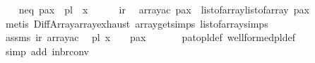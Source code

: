 \begin{isabellebody}
\ \ \isamarkupfalse%
\ neq{\isacharcolon}{\kern0pt}\ {\isachardoublequoteopen}pa{\isacharbrackleft}{\kern0pt}{\isacharbrackleft}{\kern0pt}x{}{\isacharbrackright}{\kern0pt}{\isacharbrackright}{\kern0pt}{\isacharbrackleft}{\kern0pt}{\isacharbrackleft}{\kern0pt}{}{\isacharbrackright}{\kern0pt}{\isacharbrackright}{\kern0pt}\ {\isasymnoteq}\ pl\ {\isacharbang}{\kern0pt}\ x{}\ {\isacharbang}{\kern0pt}\ {}{\isachardoublequoteclose}\isanewline
\ \ \isamarkupfalse%
\ ir\ \isamarkupfalse%
\ arrayac{\isacharcolon}{\kern0pt}\ {\isachardoublequoteopen}pa{\isacharbrackleft}{\kern0pt}{\isacharbrackleft}{\kern0pt}x{}{\isacharbrackright}{\kern0pt}{\isacharbrackright}{\kern0pt}{\isacharbrackleft}{\kern0pt}{\isacharbrackleft}{\kern0pt}{}{\isacharbrackright}{\kern0pt}{\isacharbrackright}{\kern0pt}\ {\isacharequal}{\kern0pt}\ list{\isacharunderscore}{\kern0pt}of{\isacharunderscore}{\kern0pt}array{\isacharparenleft}{\kern0pt}{\isacharparenleft}{\kern0pt}list{\isacharunderscore}{\kern0pt}of{\isacharunderscore}{\kern0pt}array\ pa{\isacharparenright}{\kern0pt}{\isacharbang}{\kern0pt}x{}{\isacharparenright}{\kern0pt}{\isacharbang}{\kern0pt}{}{\isachardoublequoteclose}\isanewline
\ \ \ \ \isamarkupfalse%
\ {\isacharparenleft}{\kern0pt}metis\ Diff{\isacharunderscore}{\kern0pt}Array{\isachardot}{\kern0pt}array{\isachardot}{\kern0pt}exhaust\ array{\isacharunderscore}{\kern0pt}get{\isachardot}{\kern0pt}simps\ list{\isacharunderscore}{\kern0pt}of{\isacharunderscore}{\kern0pt}array{\isachardot}{\kern0pt}simps{\isacharparenright}{\kern0pt}\isanewline
\ \ \isamarkupfalse%
\ assms\ ir\ arrayac\ \isamarkupfalse%
\ {\isachardoublequoteopen}pl{\isacharbang}{\kern0pt}\ x{}\ {\isacharbang}{\kern0pt}\ {}\ {\isacharequal}{\kern0pt}\ pa{\isacharbrackleft}{\kern0pt}{\isacharbrackleft}{\kern0pt}x{}{\isacharbrackright}{\kern0pt}{\isacharbrackright}{\kern0pt}{\isacharbrackleft}{\kern0pt}{\isacharbrackleft}{\kern0pt}{}{\isacharbrackright}{\kern0pt}{\isacharbrackright}{\kern0pt}{\isachardoublequoteclose}\ \isanewline
\ \ \ \ \isamarkupfalse%
\ pa{\isacharunderscore}{\kern0pt}to{\isacharunderscore}{\kern0pt}pl{\isacharunderscore}{\kern0pt}def\ well{\isacharunderscore}{\kern0pt}formed{\isacharunderscore}{\kern0pt}pl{\isacharunderscore}{\kern0pt}def\isanewline
\ \ \ \ \isamarkupfalse%
\ {\isacharparenleft}{\kern0pt}simp\ add{\isacharcolon}{\kern0pt}\ in{\isacharunderscore}{\kern0pt}br{\isacharunderscore}{\kern0pt}conv{\isacharparenright}{\kern0pt}\ \ \isanewline

\end{isabellebody}
